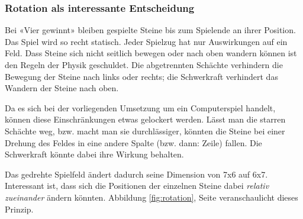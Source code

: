 \documentclass[a4paper,11pt,hidelinks]{scrartcl}
\newcommand{\imgref}[1]{{Abbildung \ref{#1}, Seite \pageref{#1}}}
\begin{document}
\subsubsection{Rotation als interessante Entscheidung}

Bei «Vier gewinnt» bleiben gespielte Steine bis zum Spielende an ihrer Position. Das Spiel wird so recht statisch. Jeder Spielzug hat nur Auswirkungen auf ein Feld. Dass Steine sich nicht seitlich bewegen oder nach oben wandern können ist den Regeln der Physik geschuldet. Die abgetrennten Schächte verhindern die Bewegung der Steine nach links oder rechts; die Schwerkraft verhindert das Wandern der Steine nach oben.

Da es sich bei der vorliegenden Umsetzung um ein Computerspiel handelt, können diese Einschränkungen etwas gelockert werden. Lässt man die starren Schächte weg, bzw. macht man sie durchlässiger, könnten die Steine bei einer Drehung des Feldes in eine andere Spalte (bzw. dann: Zeile) fallen. Die Schwerkraft könnte dabei ihre Wirkung behalten.

Das gedrehte Spielfeld ändert dadurch seine Dimension von 7x6 auf 6x7. Interessant ist, dass sich die Positionen der einzelnen Steine dabei \textit{relativ zueinander} ändern könnten. \imgref{fig:rotation} veranschaulicht dieses Prinzip.
\end{document}

